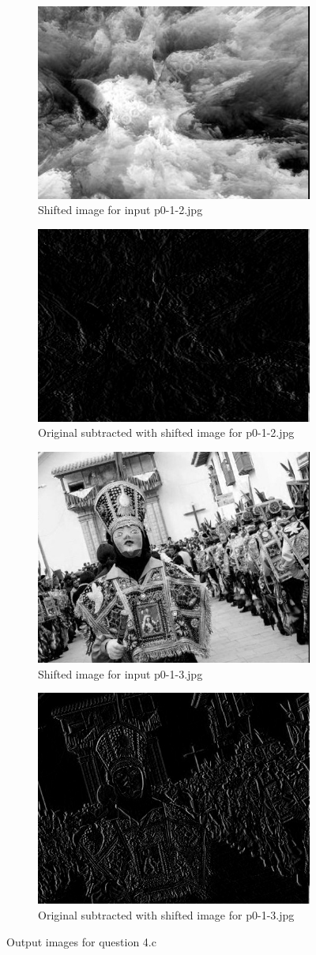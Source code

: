 \begin{enumerate}[label=\emph{\alph*)}]
\begin{figure}[h!]
\begin{subfigure}{0.5\textwidth}
  \centering
  \includegraphics[width=0.5\linewidth]{../output/p0-4-c-4.jpg}
  \caption{Shifted image for input p0-1-2.jpg}
\end{subfigure}%
\begin{subfigure}{0.5\textwidth}
  \centering
  \includegraphics[width=0.5\linewidth]{../output/p0-4-c-5.jpg}
  \caption{Original subtracted with shifted image for p0-1-2.jpg}
\end{subfigure}
\begin{subfigure}{0.5\textwidth}
  \centering
  \includegraphics[width=0.5\linewidth]{../output/p0-4-c-6.jpg}
  \caption{Shifted image for input p0-1-3.jpg}
\end{subfigure}%
\begin{subfigure}{0.5\textwidth}
  \centering
  \includegraphics[width=0.5\linewidth]{../output/p0-4-c-7.jpg}
  \caption{Original subtracted with shifted image for p0-1-3.jpg}
\end{subfigure}

\caption{Output images for question 4.c}
\label{fig:shifted-results}
\end{figure}
\end{enumerate}
